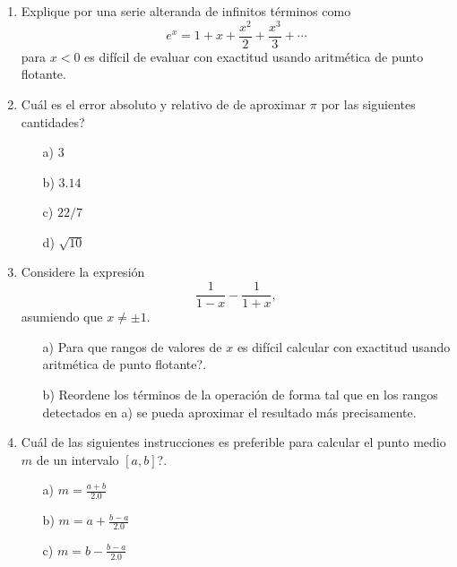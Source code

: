 \documentclass[11pt]{article}
\begin{document}
\begin{enumerate}
\item Explique por una serie alteranda de infinitos t\'erminos como
$$
\displaystyle
e^x=1+x+\frac{x^2}{2} + \frac{x^3}{3} + \cdots
$$
para $x<0$ es dif\'icil de evaluar con exactitud usando aritm\'etica de punto flotante.

\item \textquestiondown Cu\'al es el error absoluto y relativo de de aproximar $\pi$ por 
las siguientes cantidades?
\begin{multicols}{2}
\begin{itemize}
 \item[a)] $3$
 \item[b)] $3.14$
 \item[c)] $22/7$
 \item[d)] $\sqrt{10}$
 \end{itemize}
\end{multicols}

\item Considere la expresi\'on
$$
\displaystyle
\frac{1}{1-x}-\frac{1}{1+x},
$$
asumiendo que $x\neq \pm 1$.
\begin{itemize}
 \item[a)] \textquestiondown Para que rangos de valores de $x$ es dif\'icil calcular con exactitud usando aritm\'etica de punto flotante?.
 \item[b)] Reordene los t\'erminos de la operaci\'on de forma tal que en los rangos detectados en a) se pueda 
 aproximar el resultado m\'as precisamente.
\end{itemize}

\item \textquestiondown Cu\'al de las siguientes instrucciones es preferible para calcular el punto medio $m$ 
de un intervalo $[a,b]$?.
\begin{multicols}{3}
 \begin{itemize}
  \item[a)] $m=\frac{a+b}{2.0}$
  \item[b)] $m=a+\frac{b-a}{2.0}$
  \item[c)] $m=b-\frac{b-a}{2.0}$
 \end{itemize}

\end{multicols}



\end{enumerate}
\end{document}

